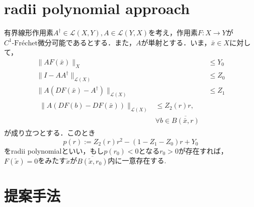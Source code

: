 \documentclass[a4paper,10pt,twocolumn]{jsarticle}
\newcommand{\rad}{radii polynomial approach}
\newcommand{\fre}{Fr\'{e}chet}
\begin{document}
\section{\rad{} \cite{github}}
\vspace{-1mm}

\begin{Thm}
  \label{thm:radii}
  有界線形作用素$A^\dagger \in \mathcal{L}(X, Y), A \in \mathcal{L}(Y, X)$を考え，作用素$F:X \rightarrow Y$が$C^1\text{-\fre{}}$微分可能であるとする．また，$A$が単射とする．いま，$\bar{x} \in X$に対して，
  \begin{align}
      \|AF(\bar{x})\|_X                             & \leq Y_0                                             \\
      \|I-AA^\dagger\|_{\mathcal{L}(X)}              & \leq Z_0                                             \\
      \|A(DF(\bar{x})-A^\dagger)\|_{\mathcal{L}(X)} & \leq Z_1                                             \\
      \begin{split}
        \|A(DF(b)-DF(\bar{x}))\|_{\mathcal{L}(X)} &\leq Z_2(r)r, \\ & \forall b \in \overline{B(\bar{x},r)}
      \end{split}
  \end{align}
  が成り立つとする．このとき
  \begin{equation}
    p(r) := Z_2(r)r^2 - (1-Z_1-Z_0)r+Y_0
  \end{equation}
  をradii polynomialといい，もし$p(r_0)<0$となる$r_0>0$が存在すれば，$F(\tilde{x})=0$をみたす$\tilde{x}$が$\overline{B(\tilde{x},r_0)}$内に一意存在する.
\end{Thm}

\vspace{-1mm}
\section{提案手法}
\vspace{-1mm}
\end{document}

